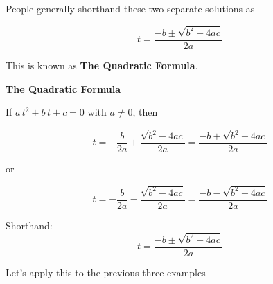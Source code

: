 \documentclass{ximera}
\begin{document}
People generally shorthand these two separate solutions as



\[ t  =   \frac{-b \pm \sqrt{b^2 - 4 a c}}{2a}      \]


This is known as \textbf{The Quadratic Formula}.




\begin{definition} \textbf{\textcolor{green!50!black}{The Quadratic Formula}} 



If $a \, t^2 + b \, t + c = 0$ with $a \ne 0$, then


\[ t   = - \frac{b}{2 a} + \frac{\sqrt{b^2 - 4 a c}}{2a}  = \frac{-b + \sqrt{b^2 - 4 a c}}{2a}      \]

or

\[ t  = - \frac{b}{2 a}  -\frac{\sqrt{b^2 - 4 a c}}{2a} =    \frac{-b - \sqrt{b^2 - 4 a c}}{2a}      \]



Shorthand: 
\[ t  =   \frac{-b \pm \sqrt{b^2 - 4 a c}}{2a}      \]


\end{definition}









Let's apply this to the previous three examples
\end{document}
